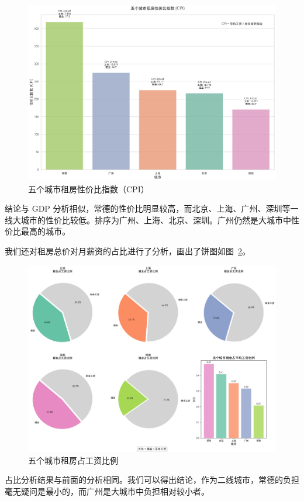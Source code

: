 \begin{figure}[htbp]
    \centering
    \includegraphics[width=0.7\linewidth]{../../figure/salary_cpi_bar_chart.png}
    \caption{五个城市租房性价比指数（CPI）}
    \label{fig:salary_cpi_bar_chart}
\end{figure}
结论与 GDP 分析相似，常德的性价比明显较高，而北京、上海、广州、深圳等一线大城市的性价比较低。排序为广州、上海、北京、深圳。广州仍然是大城市中性价比最高的城市。

我们还对租房总价对月薪资的占比进行了分析，画出了饼图如图~\ref{fig:salary_price_pie_chart}。
\begin{figure}[htbp]
    \centering
    \includegraphics[width=0.7\linewidth]{../../figure/salary_price_pie_chart.png}
    \caption{五个城市租房占工资比例}
    \label{fig:salary_price_pie_chart}
\end{figure}

占比分析结果与前面的分析相同。我们可以得出结论，作为二线城市，常德的负担毫无疑问是最小的，而广州是大城市中负担相对较小者。